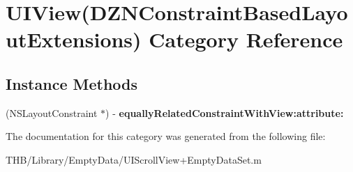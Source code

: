 \hypertarget{category_u_i_view_07_d_z_n_constraint_based_layout_extensions_08}{}\section{U\+I\+View(D\+Z\+N\+Constraint\+Based\+Layout\+Extensions) Category Reference}
\label{category_u_i_view_07_d_z_n_constraint_based_layout_extensions_08}
\subsection*{Instance Methods}
\begin{DoxyCompactItemize}
\item 
\mbox{\label{category_u_i_view_07_d_z_n_constraint_based_layout_extensions_08_a68bdb751462fa1b6f122dce8a0345a66}} 
(N\+S\+Layout\+Constraint $\ast$) -\/ {\bfseries equally\+Related\+Constraint\+With\+View\+:attribute\+:}
\end{DoxyCompactItemize}


The documentation for this category was generated from the following file\+:\begin{DoxyCompactItemize}
\item 
T\+H\+B/\+Library/\+Empty\+Data/U\+I\+Scroll\+View+\+Empty\+Data\+Set.\+m\end{DoxyCompactItemize}
